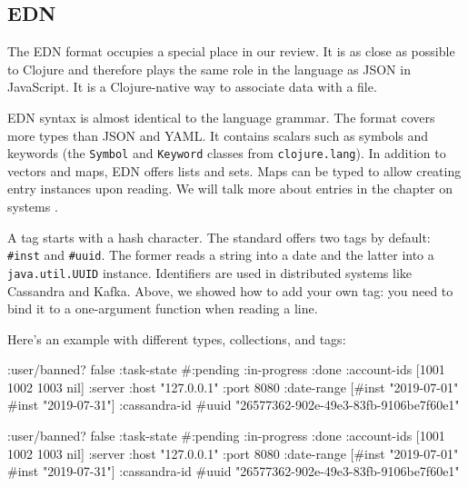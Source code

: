\subsection{EDN}


The EDN format occupies a special place in our review. It is as close as possible to Clojure and therefore plays the same role in the language as JSON in JavaScript. It is a Clojure-native way to associate data with a file.

EDN syntax is almost identical to the language grammar. The format covers more types than JSON and YAML. It contains scalars such as symbols and keywords (the \verb|Symbol| and \verb|Keyword| classes from \verb|clojure.lang|). In addition to vectors and maps, EDN offers lists and sets. Maps can be typed to allow creating entry instances upon reading. We will talk more about entries in the chapter on systems .


A tag starts with a hash character. The standard offers two tags by default: \verb|#inst| and \verb|#uuid|. The former reads a string into a date and the latter into a \verb|java.util.UUID| instance. Identifiers are used in distributed systems like Cassandra and Kafka. Above, we showed how to add your own tag: you need to bind it to a one-argument function when reading a line.

Here's an example with different types, collections, and tags:

\ifx\DEVICETYPE\MOBILE

\begin{english}
  \begin{clojure}
{:user/banned? false
 :task-state
 #{:pending :in-progress :done}
 :account-ids
 [1001 1002 1003 nil]
 :server
 {:host "127.0.0.1" :port 8080}
 :date-range
 [#inst "2019-07-01" #inst "2019-07-31"]
 :cassandra-id #uuid
 "26577362-902e-49e3-83fb-9106be7f60e1"}
  \end{clojure}
\end{english}

\else

\begin{english}
  \begin{clojure}
{:user/banned? false
 :task-state #{:pending :in-progress :done}
 :account-ids [1001 1002 1003 nil]
 :server {:host "127.0.0.1" :port 8080}
 :date-range [#inst "2019-07-01" #inst "2019-07-31"]
 :cassandra-id #uuid "26577362-902e-49e3-83fb-9106be7f60e1"}
  \end{clojure}
\end{english}

